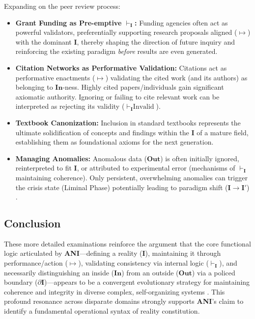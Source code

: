 \documentclass{article}
\newcommand{\ANI}{\textbf{ANI}}             %
\newcommand{\Isness}{\mathbf{I}}            %
\newcommand{\Inness}{\mathbf{In}}           %
\newcommand{\Outness}{\mathbf{Out}}         %
\newcommand{\enactment}{\ensuremath{\mapsto}} %
\newcommand{\validates}[1]{\ensuremath{\vdash_{#1}}} %
\newcommand{\boundary}[1]{\ensuremath{\partial #1}} %
\begin{document}
Expanding on the peer review process:
\begin{itemize}
    \item \textbf{Grant Funding as Pre-emptive $\validates{\Isness}$:} Funding agencies often act as powerful validators, preferentially supporting research proposals aligned ($\enactment$) with the dominant $\Isness$, thereby shaping the direction of future inquiry and reinforcing the existing paradigm \textit{before} results are even generated.
    \item \textbf{Citation Networks as Performative Validation:} Citations act as performative enactments ($\enactment$) validating the cited work (and its authors) as belonging to $\Inness$-ness. Highly cited papers/individuals gain significant axiomatic authority. Ignoring or failing to cite relevant work can be interpreted as rejecting its validity ($\validates{\Isness} \text{Invalid}$).
    \item \textbf{Textbook Canonization:} Inclusion in standard textbooks represents the ultimate solidification of concepts and findings within the $\Isness$ of a mature field, establishing them as foundational axioms for the next generation.
    \item \textbf{Managing Anomalies:} Anomalous data ($\Outness$) is often initially ignored, reinterpreted to fit $\Isness$, or attributed to experimental error (mechanisms of $\validates{\Isness}$ maintaining coherence). Only persistent, overwhelming anomalies can trigger the crisis state (Liminal Phase) potentially leading to paradigm shift ($\Isness \rightarrow \Isness'$) \citep{Kuhn1962}.
\end{itemize}

\subsection{Conclusion}

These more detailed examinations reinforce the argument that the core functional logic articulated by \ANI{}—defining a reality ($\Isness$), maintaining it through performance/action ($\enactment$), validating consistency via internal logic ($\validates{\Isness}$), and necessarily distinguishing an inside ($\Inness$) from an outside ($\Outness$) via a policed boundary ($\boundary{\Isness}$)—appears to be a convergent evolutionary strategy for maintaining coherence and integrity in diverse complex, self-organizing systems \citep{Luhmann1995}. This profound resonance across disparate domains strongly supports \ANI{}’s claim to identify a fundamental operational syntax of reality constitution.
\end{document}
